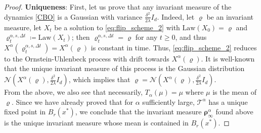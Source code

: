 \documentclass[reqno]{amsart}
\numberwithin{algorithm}{section}
\newcommand{\law}{\mathrm{Law}}
\newcommand{\mc}[1]{\mathcal{#1}}
\begin{document}
{\begin{proof}
\textbf{Uniqueness}:
First, let us prove that any invariant measure of the dynamics \eqref{CBO} is a Gaussian with variance $\frac{\delta^2}{2\lambda}I_d$. Indeed, let $\varrho$ be an invariant measure, let $X_t$ be a solution to \cref{eq:flip_scheme_2} with $\law(X_0) = \varrho$ and $\varrho^{\alpha,s,\Delta t}_t \coloneqq \law(X_t)$; then $\varrho^{\alpha,s,\Delta t}_t = \varrho$ for any $t\geq 0$, and thus $X^\alpha(\varrho^{\alpha,s,\Delta t}_t) = X^\alpha(\varrho)$ is constant in time. Thus, \cref{eq:flip_scheme_2} reduces to the Ornstein-Uhlenbeck process with drift towards $X^\alpha(\varrho)$. It is well-known that the unique invariant measure of this process is the Gaussian distribution $\mc{N}\left(X^\alpha(\varrho),\frac{\delta^2}{2\lambda}I_d\right)$, which implies that $\varrho = \mc{N}\left(X^\alpha(\varrho),\frac{\delta^2}{2\lambda}I_d\right)$. \\
From the above, we also see that necessarily, $T_\alpha(\mu) = \mu$ where $\mu$ is the mean of $\varrho$. Since we have already proved that for $\alpha$ sufficiently large, $\mc{T}^\alpha$ has a unique fixed point in $B_r(x^*)$, we conclude that the invariant measure $\boldsymbol\rho_\infty^\alpha$ found above is the unique invariant measure whose mean is contained in $B_r(x^*)$.
\end{proof}

}
\end{document}
